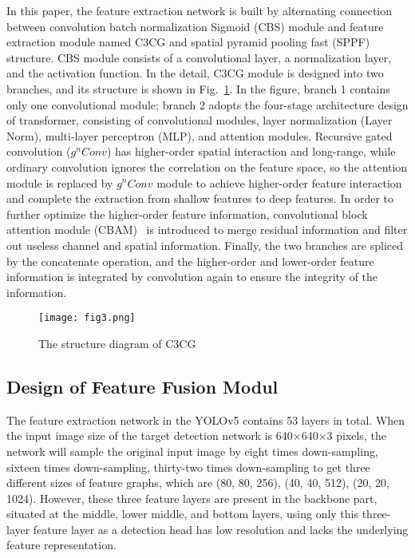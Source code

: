 \documentclass[sn-mathphys,Numbered]{sn-jnl}%
\theoremstyle{thmstyleone}%
\theoremstyle{thmstyletwo}%
\theoremstyle{thmstylethree}%
\begin{document}
In this paper, the feature extraction network is built by alternating connection between convolution batch normalization Sigmoid (CBS) module and feature extraction module named C3CG and spatial pyramid pooling fast (SPPF) structure. CBS module consists of a convolutional layer, a normalization layer, and the activation function. In the detail, C3CG module is designed into two branches, and its structure is shown in Fig.~\ref{fig3}. In the figure, branch 1 contains only one convolutional module; branch 2 adopts the four-stage architecture design of transformer, consisting of convolutional modules, layer normalization (Layer Norm), multi-layer perceptron (MLP), and attention modules. Recursive gated convolution (${g^n}Conv$) has higher-order spatial interaction and long-range, while ordinary convolution ignores the correlation on the feature space, so the attention module is replaced by ${g^n}Conv$ module to achieve higher-order feature interaction and complete the extraction from shallow features to deep features. In order to further optimize the higher-order feature information, convolutional block attention module (CBAM)~\cite{woo2018cbam} is introduced to merge residual information and filter out useless channel and spatial information. Finally, the two branches are spliced by the concatenate operation, and the higher-order and lower-order feature information is integrated by convolution again to ensure the integrity of the information.

\begin{figure}[h]%
\centering
\texttt{[image: fig3.png]}
\caption{The structure diagram of C3CG}\label{fig3}
\end{figure}

\subsection{Design of Feature Fusion Modul}

The feature extraction network in the YOLOv5 contains 53 layers in total. When the input image size of the target detection network is 640×640×3 pixels, the network will sample the original input image by eight times down-sampling, sixteen times down-sampling, thirty-two times down-sampling to get three different sizes of feature graphs, which are (80, 80, 256), (40, 40, 512), (20, 20, 1024). However, these three feature layers are present in the backbone part, situated at the middle, lower middle, and bottom layers, using only this three-layer feature layer as a detection head has low resolution and lacks the underlying feature representation.
\end{document}
